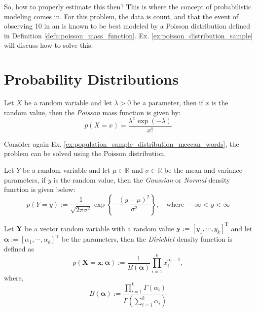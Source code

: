 \begin{exmp}
So, how to properly estimate this then? This is where the concept of probabilistic modeling comes in. For this problem, the data is count, and that the event of observing 10   in an  is known to be best modeled by a Poisson distribution defined in Definition \ref{defn:poisson_mass_function}. Ex. \ref{ex:poisson_distribution_sample} will discuss how to solve this. 
\end{exmp}
\section{Probability Distributions}
\begin{defn}\label{defn:poisson_mass_function}
Let $X$ be a random variable and let $\lambda>0$ be a parameter, then if $x$ is the random value, then the \textit{Poisson} mass function is given by:
\begin{equation}
     p(X=x)=\frac{\lambda^x\exp(-\lambda)}{x!}
\end{equation}
\end{defn}
\begin{exmp}\label{ex:poisson_distribution_sample}
Consider again Ex. \ref{ex:population_sample_distribution_meccan_words}, the problem can be solved using the Poisson distribution.
\end{exmp}
\begin{defn}
Let $Y$ be a random variable and let $\mu\in\mathbb{R}$ and $\sigma\in\mathbb{R}$ be the mean and variance parameters, if $y$ is the random value, then the \textit{Gaussian} or \textit{Normal} density function is given below:
\begin{equation}
     p(Y=y):=\frac{1}{\sqrt{2\pi\sigma^2}}\exp\left\{-\frac{(y-\mu)^2}{\sigma^2}\right\},\quad\text{where}\;-\infty<y<\infty
\end{equation}
\end{defn}
\begin{defn}
Let $\mathbf{Y}$ be a vector random variable with a random value $\mathbf{y}:=[y_1,\cdots,y_k]^{\text{T}}$ and let $\boldsymbol{\alpha}:=[\alpha_1,\cdots,\alpha_k]^{\text{T}}$ be the parameters, then the \textit{Dirichlet} density function is defined as
\begin{equation}
     p(\mathbf{X}=\mathbf{x};\boldsymbol{\alpha}):=\frac{1}{B(\boldsymbol{\alpha})}\prod_{i=1}^kx_i^{\alpha_i-1},
\end{equation}
where,
\begin{equation}
    B(\boldsymbol{\alpha}):=\frac{\displaystyle\prod_{i=1}^k\Gamma(\alpha_i)}{\Gamma\left(\sum_{i=1}^k\alpha_i\right)}
\end{equation}

\end{defn}
